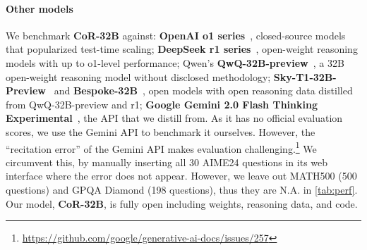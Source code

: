 \documentclass{article}
\theoremstyle{plain}
\theoremstyle{definition}
\theoremstyle{remark}
\newcommand{\model}{\textbf{CoR-32B}}
\begin{document}
\paragraph{Other models} We benchmark \model{} against: \textbf{OpenAI o1 series}~\citep{o1}, closed-source models that popularized test-time scaling; \textbf{DeepSeek r1 series}~\citep{r1}, open-weight reasoning models with up to o1-level performance; Qwen's \textbf{QwQ-32B-preview}~\citep{qwq-32b-preview}, a 32B open-weight reasoning model without disclosed methodology; \textbf{Sky-T1-32B-Preview}~\citep{sky_t1} and \textbf{Bespoke-32B}~\citep{bespoke_stratos}, open models with open reasoning data distilled from QwQ-32B-preview and r1; \textbf{Google Gemini 2.0 Flash Thinking Experimental}~\citep{geminithinking}, the API that we distill from. As it has no official evaluation scores, we use the Gemini API to benchmark it ourselves. However, the ``recitation error'' of the Gemini API makes evaluation challenging.\footnote{\url{https://github.com/google/generative-ai-docs/issues/257}} We circumvent this, by manually inserting all 30 AIME24 questions in its web interface where the error does not appear. However, we leave out MATH500 (500 questions) and GPQA Diamond (198 questions), thus they are N.A. in \autoref{tab:perf}. Our model, \model{}, is fully open including weights, reasoning data, and code.
\end{document}
